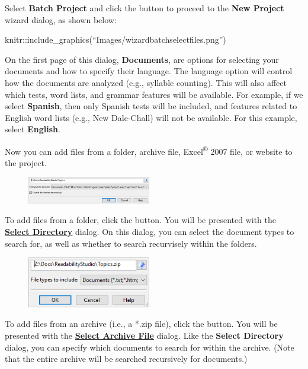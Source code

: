 \documentclass[
]{book}
\theoremstyle{definition}
\theoremstyle{definition}
\theoremstyle{definition}
\theoremstyle{definition}
\theoremstyle{remark}
\begin{document}
Select \textbf{Batch Project} and click the  button to proceed to the \textbf{New Project} wizard dialog, as shown below:

knitr::include\_graphics(``Images/wizardbatchselectfiles.png'')

On the first page of this dialog, \textbf{Documents}, are options for selecting your documents and how to specify their language. The language option will control how the documents are analyzed (e.g., syllable counting). This will also affect which tests, word lists, and grammar features will be available. For example, if we select \textbf{Spanish}, then only Spanish tests will be included, and features related to English word lists (e.g., New Dale-Chall) will not be available. For this example, select \textbf{English}.

Now you can add files from a folder, archive file, Excel\textsuperscript{®} 2007 file, or website to the project.

\begin{figure}
\includegraphics[width=0.48\textwidth,height=\textheight]{Images/selectdirectory.png}

\end{figure}

To add files from a folder, click the  button. You will be presented with the \protect\hyperlink{select-directory}{\textbf{Select Directory}} dialog. On this dialog, you can select the document types to search for, as well as whether to search recurvisely within the folders.

\begin{figure}
\includegraphics[width=0.48\textwidth,height=\textheight]{Images/selectarchive.png}

\end{figure}

To add files from an archive (i.e., a *.zip file), click the  button. You will be presented with the \protect\hyperlink{select-archive}{\textbf{Select Archive File}} dialog. Like the \textbf{Select Directory} dialog, you can specify which documents to search for within the archive. (Note that the entire archive will be searched recursively for documents.)
\end{document}
